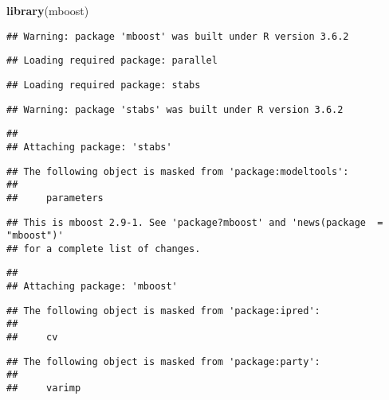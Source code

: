 \documentclass[]{article}
\newenvironment{Shaded}{\begin{snugshade}}{\end{snugshade}}
\newcommand{\DataTypeTok}[1]{\textcolor[rgb]{0.13,0.29,0.53}{#1}}
\newcommand{\DecValTok}[1]{\textcolor[rgb]{0.00,0.00,0.81}{#1}}
\newcommand{\KeywordTok}[1]{\textcolor[rgb]{0.13,0.29,0.53}{\textbf{#1}}}
\newcommand{\NormalTok}[1]{#1}
\newcommand{\OperatorTok}[1]{\textcolor[rgb]{0.81,0.36,0.00}{\textbf{#1}}}
\newcommand{\StringTok}[1]{\textcolor[rgb]{0.31,0.60,0.02}{#1}}
\begin{document}
\begin{Shaded}
\begin{Highlighting}[]
\KeywordTok{library}\NormalTok{(mboost)}
\end{Highlighting}
\end{Shaded}

\begin{verbatim}
## Warning: package 'mboost' was built under R version 3.6.2
\end{verbatim}

\begin{verbatim}
## Loading required package: parallel
\end{verbatim}

\begin{verbatim}
## Loading required package: stabs
\end{verbatim}

\begin{verbatim}
## Warning: package 'stabs' was built under R version 3.6.2
\end{verbatim}

\begin{verbatim}
## 
## Attaching package: 'stabs'
\end{verbatim}

\begin{verbatim}
## The following object is masked from 'package:modeltools':
## 
##     parameters
\end{verbatim}

\begin{verbatim}
## This is mboost 2.9-1. See 'package?mboost' and 'news(package  = "mboost")'
## for a complete list of changes.
\end{verbatim}

\begin{verbatim}
## 
## Attaching package: 'mboost'
\end{verbatim}

\begin{verbatim}
## The following object is masked from 'package:ipred':
## 
##     cv
\end{verbatim}

\begin{verbatim}
## The following object is masked from 'package:party':
## 
##     varimp
\end{verbatim}

\begin{Shaded}
\end{Shaded}
\end{document}
